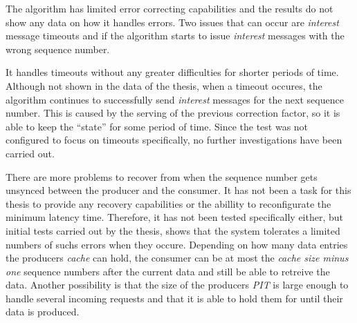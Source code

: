 %	

The algorithm has limited error correcting capabilities and the results do not show any data on how it handles errors. Two issues that can occur are \textit{interest} message timeouts and if the algorithm starts to issue \textit{interest} messages with the wrong sequence number. 

It handles timeouts without any greater difficulties for shorter periods of time. Although not shown in the data of the thesis, when a timeout occures, the algorithm continues to successfully send \textit{interest} messages for the next sequence number. This is caused by the serving of the previous correction factor, so it is able to keep the ``state'' for some period of time. Since the test was not configured to focus on timeouts specifically, no further investigations have been carried out.

There are more problems to recover from when the sequence number gets unsynced between the producer and the consumer. 
It has not been a task for this thesis to provide any recovery capabilities or the abillity to reconfigurate the minimum latency time. Therefore, it has not been tested specifically either, but initial tests carried out by the thesis, shows that the system tolerates a limited numbers of suchs errors when they occure. Depending on how many data entries the producers \textit{cache} can hold, the consumer can be at most the \textit{cache size minus one} sequence numbers after the current data and still be able to retreive the data. 
Another possibility is that the size of the producers \textit{PIT} is large enough to handle several incoming requests and that it is able to hold them for until their data is produced. 




%


